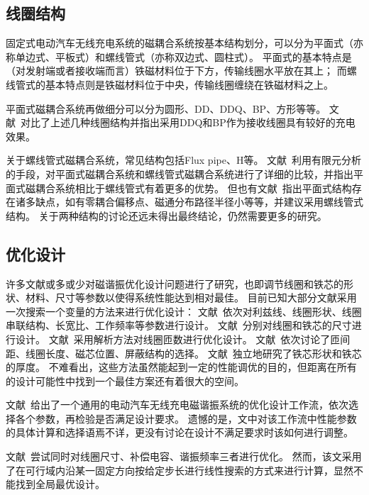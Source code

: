 \documentclass[index]{subfiles}
\begin{document}
\subsection{线圈结构}
固定式电动汽车无线充电系统的磁耦合系统按基本结构划分，可以分为平面式（亦称单边式、平板式）和螺线管式（亦称双边式、圆柱式）\cite{高大威2015}。
平面式的基本特点是（对发射端或者接收端而言）铁磁材料位于下方，传输线圈水平放在其上；
而螺线管式的基本特点则是铁磁材料位于中央，传输线圈缠绕在铁磁材料之上。

平面式磁耦合系统再做细分可以分为圆形\cite{budhia2011}、DD\cite{budhia2013}、DDQ\cite{budhia2013}、BP\cite{covic2011}、方形\cite{choi2014}等等。
文献~对比了上述几种线圈结构并指出采用DDQ和BP作为接收线圈具有较好的充电效果。

关于螺线管式磁耦合系统，常见结构包括Flux pipe\cite{budhia2010}、H\cite{takanashi2012}等。
文献~利用有限元分析的手段，对平面式磁耦合系统和螺线管式磁耦合系统进行了详细的比较，并指出平面式磁耦合系统相比于螺线管式有着更多的优势。
但也有文献~指出平面式结构存在诸多缺点，如有零耦合偏移点、磁通分布路径半径小等等，并建议采用螺线管式结构。
关于两种结构的讨论还远未得出最终结论，仍然需要更多的研究。

\subsection{优化设计}\label{sec:intro-opt}
许多文献或多或少对磁谐振优化设计问题进行了研究，也即调节线圈和铁芯的形状、材料、尺寸等参数以使得系统性能达到相对最佳。
目前已知大部分文献采用一次搜索一个变量的方法来进行优化设计：
文献~依次对利兹线、线圈形状、线圈串联结构、长宽比、工作频率等参数进行设计。
文献~分别对线圈和铁芯的尺寸进行设计。
文献~采用解析方法对线圈匝数进行优化设计。
文献~依次讨论了匝间距、线圈长度、磁芯位置、屏蔽结构的选择。
文献~独立地研究了铁芯形状和铁芯的厚度。
不难看出，这些方法虽然能起到一定的性能调优的目的，但距离在所有的设计可能性中找到一个最佳方案还有着很大的空间。

文献~给出了一个通用的电动汽车无线充电磁谐振系统的优化设计工作流，依次选择各个参数，再检验是否满足设计要求。
遗憾的是，文中对该工作流中性能参数的具体计算和选择语焉不详，更没有讨论在设计不满足要求时该如何进行调整。

文献~尝试同时对线圈尺寸、补偿电容、谐振频率三者进行优化。
然而，该文采用了在可行域内沿某一固定方向按给定步长进行线性搜索的方式来进行计算，显然不能找到全局最优设计。
\end{document}

